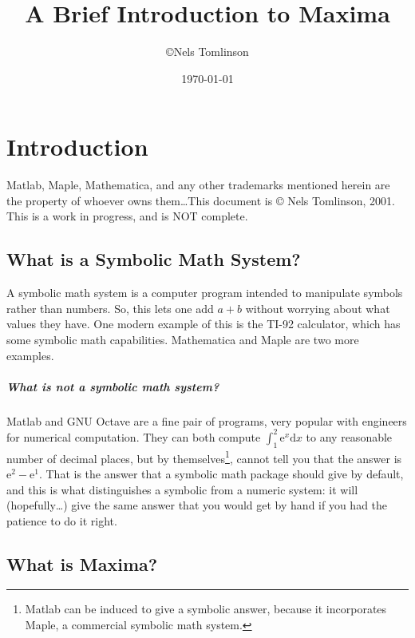 \documentclass[titlepage]{article}
\newcommand{\e}{\mathrm{e}}%
\newcommand{\dd}{\mathrm{d}}%
\begin{document}
\title{A Brief Introduction to Maxima}
\author{\copyright Nels Tomlinson}

\date{\today}

\vspace{-1.0cm}
\maketitle


\tableofcontents
\clearpage

\section{Introduction}

Matlab, Maple, Mathematica, and any other trademarks mentioned herein
are the property of whoever owns them\dots  This document is \copyright{
Nels Tomlinson, 2001}.  This is a work in progress, and is NOT complete.

\subsection{What is a Symbolic Math System?}

A symbolic  math system is  a computer program intended to manipulate
symbols rather than numbers. So, this lets one add $a+b$ without
worrying about what values they have. One modern example of this is the
TI-92 calculator, which has some symbolic math capabilities.
Mathematica and Maple are two more examples.

\subparagraph{What is \emph{not} a symbolic math system?}  Matlab and
GNU Octave are a fine pair of programs, very popular with engineers for
numerical computation.  They can both compute $\int_{1}^{2}\e^x \dd x$
to any reasonable number of decimal places, but by
themselves\footnote{Matlab can be induced to give a symbolic answer,
because it incorporates Maple, a commercial symbolic math system.},
cannot tell you that the answer is $\e^2-\e^1$.  That is the answer that
a symbolic math package should give by default, and this is what
distinguishes a symbolic from a numeric system: it will (hopefully\dots)
give the same answer that you would get by hand if you had the patience
to do it right.

\subsection{What is Maxima?}
\end{document}
